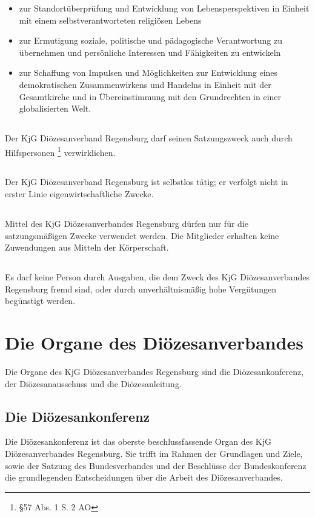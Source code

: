 \documentclass[12pt]{report}
\begin{document}
\begin{flushleft}
\begin{itemize}
\begin{itemize}
      \item zur Standortüberprüfung und Entwicklung von Lebensperspektiven in Einheit mit einem 
            selbstverantworteten religiösen Lebens
      \item zur Ermutigung soziale, politische und pädagogische Verantwortung zu übernehmen und 	
            persönliche Interessen und Fähigkeiten zu entwickeln
      \item zur Schaffung von Impulsen und Möglichkeiten zur Entwicklung eines demokratischen Zusammenwirkens
            und Handelns in Einheit mit der Gesamtkirche und in Übereinstimmung 
            mit den Grundrechten in einer globalisierten Welt.
    \end{itemize}
\end{itemize}
\subsection{}
Der KjG Diözesanverband Regensburg darf seinen Satzungszweck auch durch Hilfspersonen \footnote{§57 Abs. 1 S. 2 AO}
verwirklichen.
\subsection{}
Der KjG Diözesanverband Regensburg ist selbstlos tätig; er verfolgt nicht in erster Linie eigenwirtschaftliche Zwecke.
\subsection{}
Mittel des KjG Diözesanverbandes Regensburg dürfen nur für die satzungsmäßigen Zwecke
verwendet werden. Die Mitglieder erhalten keine Zuwendungen aus Mitteln der Körperschaft.
\subsection{}
Es darf keine Person durch Ausgaben, die dem Zweck des KjG Diözesanverbandes Regensburg
fremd sind, oder durch unverhältnismäßig hohe Vergütungen begünstigt werden.
\section{Die Organe des Diözesanverbandes}
Die Organe des KjG Diözesanverbandes Regensburg sind die Diözesankonferenz, der Diözesanausschuss und die
Diözesanleitung.

\subsection{Die Diözesankonferenz}
Die Diözesankonferenz ist das oberste beschlussfassende Organ des KjG Diözesanverbandes Regensburg. Sie
trifft im Rahmen der Grundlagen und Ziele, sowie der Satzung des Bundesverbandes und der
Beschlüsse der Bundeskonferenz die grundlegenden Entscheidungen über die Arbeit des Diözesanverbandes.

\end{flushleft}
\end{document}

